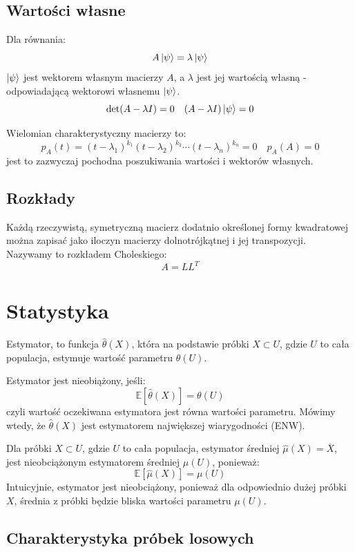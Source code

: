 \documentclass{../notatki}
\begin{document}
\subsection{Wartości własne}

Dla równania:
$$
A \ket{\psi} = \lambda \ket{\psi}
$$
$\ket{\psi}$ jest wektorem własnym macierzy $A$, a $\lambda$ jest jej
wartością własną - odpowiadającą wektorowi własnemu $\ket{\psi}$.
$$
\det(A - \lambda I) = 0 \quad (A - \lambda I) \ket{\psi} = 0
$$

Wielomian charakterystyczny macierzy to:
$$
p_A(t) = (t - \lambda_1)^{k_1} (t - \lambda_2)^{k_2} \cdots (t -
\lambda_n)^{k_n} = 0 \quad p_A(A) = 0
$$
jest to zazwyczaj pochodna poszukiwania wartości i wektorów własnych.

\subsection{Rozkłady}

Każdą rzeczywistą, symetryczną macierz dodatnio określonej formy kwadratowej
można zapisać jako iloczyn macierzy dolnotrójkątnej i jej transpozycji.
Nazywamy to rozkładem Choleskiego:
$$
A = LL^T
$$

\section{Statystyka}

Estymator, to funkcja $\hat{\theta}(X)$, która na podstawie próbki $X
\subset U$, gdzie $U$ to cała populacja, estymuje wartość parametru $\theta(U)$.

Estymator jest nieobiążony, jeśli:
$$
\mathbb{E}[\hat{\theta}(X)] = \theta(U)
$$
czyli wartość oczekiwana estymatora jest równa wartości parametru. Mówimy wtedy,
że $\hat{\theta}(X)$ jest estymatorem największej wiarygodności (ENW).

\begin{examplebox}
  Dla próbki $X \subset U$, gdzie $U$ to cała populacja, estymator
  średniej $\hat{\mu}(X) = \overline{X}$, jest nieobciążonym
  estymatorem średniej $\mu(U)$, ponieważ:
  $$
  \mathbb{E}[\hat{\mu}(X)] = \mu(U)
  $$
  Intuicyjnie, estymator jest nieobciążony, ponieważ dla odpowiednio dużej
  próbki $X$, średnia z próbki będzie bliska wartości parametru $\mu(U)$.
\end{examplebox}

\subsection{Charakterystyka próbek losowych}
\end{document}
